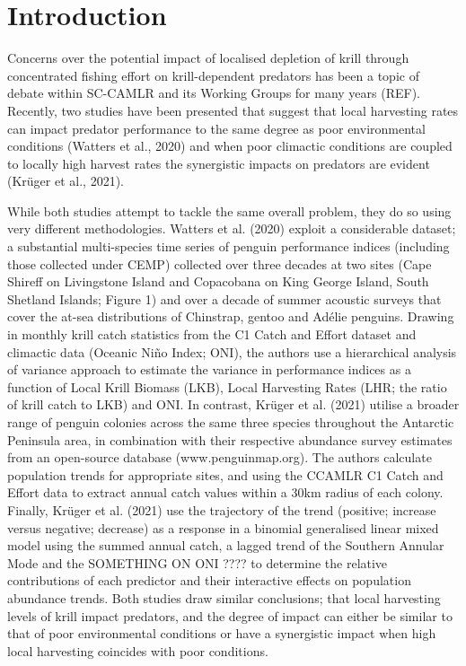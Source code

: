 \documentclass[]{elsarticle} %
\begin{document}
\hypertarget{introduction}{%
\section{Introduction}\label{introduction}}

Concerns over the potential impact of localised depletion of krill
through concentrated fishing effort on krill-dependent predators has
been a topic of debate within SC-CAMLR and its Working Groups for many
years (REF). Recently, two studies have been presented that suggest that
local harvesting rates can impact predator performance to the same
degree as poor environmental conditions (Watters et al., 2020) and when
poor climactic conditions are coupled to locally high harvest rates the
synergistic impacts on predators are evident (Krüger et al., 2021).

While both studies attempt to tackle the same overall problem, they do
so using very different methodologies. Watters et al. (2020) exploit a
considerable dataset; a substantial multi-species time series of penguin
performance indices (including those collected under CEMP) collected
over three decades at two sites (Cape Shireff on Livingstone Island and
Copacobana on King George Island, South Shetland Islands; Figure 1) and
over a decade of summer acoustic surveys that cover the at-sea
distributions of Chinstrap, gentoo and Adélie penguins. Drawing in
monthly krill catch statistics from the C1 Catch and Effort dataset and
climactic data (Oceanic Niño Index; ONI), the authors use a hierarchical
analysis of variance approach to estimate the variance in performance
indices as a function of Local Krill Biomass (LKB), Local Harvesting
Rates (LHR; the ratio of krill catch to LKB) and ONI. In contrast,
Krüger et al. (2021) utilise a broader range of penguin colonies across
the same three species throughout the Antarctic Peninsula area, in
combination with their respective abundance survey estimates from an
open-source database (www.penguinmap.org). The authors calculate
population trends for appropriate sites, and using the CCAMLR C1 Catch
and Effort data to extract annual catch values within a 30km radius of
each colony. Finally, Krüger et al. (2021) use the trajectory of the
trend (positive; increase versus negative; decrease) as a response in a
binomial generalised linear mixed model using the summed annual catch, a
lagged trend of the Southern Annular Mode and the SOMETHING ON ONI ????
to determine the relative contributions of each predictor and their
interactive effects on population abundance trends. Both studies draw
similar conclusions; that local harvesting levels of krill impact
predators, and the degree of impact can either be similar to that of
poor environmental conditions or have a synergistic impact when high
local harvesting coincides with poor conditions.
\end{document}

